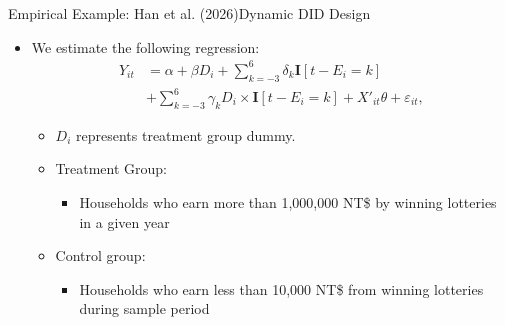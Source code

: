 \documentclass[dvipsnames,hyperref={pdfpagelabels=false}]{beamer}
\begin{document}
\begin{frame}{Empirical Example: Han et al. (2026)}{Dynamic DID Design}
	\begin{itemize} 
		\item We estimate the following regression:
		\begin{align*}
			Y_{it}&=\alpha + \beta D_{i} + \sum^{6}_{k=-3}\delta_{k} \mathbf{I}[t-E_{i}=k]  \\
			&+ \sum^{6}_{k=-3}\gamma_{k} D_{i} \times \mathbf{I}[t-E_{i}=k]
			+X'_{it}\theta+\varepsilon_{it},
		\end{align*}
	\begin{itemize} 
		\item $D_{i}$ represents treatment group dummy.	
						\vspace{0.3cm}
				\item Treatment Group:
			\vspace{0.3cm}
			\begin{itemize} 
				\item Households who earn more than 1,000,000 NT\$ by winning lotteries in a given year
			\end{itemize}
			\vspace{0.3cm}
			\item Control group:
			\vspace{0.3cm}
			\begin{itemize} 
				\item Households who earn less than 10,000 NT\$ from winning lotteries during sample period
			\end{itemize}		
				\end{itemize}
	\end{itemize}
\end{frame}
\end{document}

